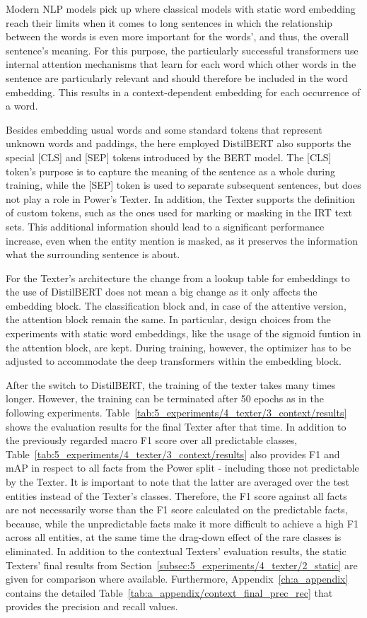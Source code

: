 Modern NLP models pick up where classical models with static word embedding reach their limits when it comes to long sentences in which the relationship between the words is even more important for the words', and thus, the overall sentence's meaning. For this purpose, the particularly successful transformers use internal attention mechanisms that learn for each word which other words in the sentence are particularly relevant and should therefore be included in the word embedding. This results in a context-dependent embedding for each occurrence of a word.

Besides embedding usual words and some standard tokens that represent unknown words and paddings, the here employed DistilBERT also supports the special [CLS] and [SEP] tokens introduced by the BERT model. The [CLS] token's purpose is to capture the meaning of the sentence as a whole during training, while the [SEP] token is used to separate subsequent sentences, but does not play a role in Power's Texter. In addition, the Texter supports the definition of custom tokens, such as the ones used for marking or masking in the IRT text sets. This additional information should lead to a significant performance increase, even when the entity mention is masked, as it preserves the information what the surrounding sentence is about.

For the Texter's architecture the change from a lookup table for embeddings to the use of DistilBERT does not mean a big change as it only affects the embedding block. The classification block and, in  case of the attentive version, the attention block remain the same. In particular, design choices from the experiments with static word embeddings, like the usage of the sigmoid funtion in the attention block, are kept. During training, however, the optimizer has to be adjusted to accommodate the deep transformers within the embedding block.

After the switch to DistilBERT, the training of the texter takes many times longer. However, the training can be terminated after 50 epochs as in the following experiments. Table~\ref{tab:5_experiments/4_texter/3_context/results} shows the evaluation results for the final Texter after that time. In addition to the previously regarded macro F1 score over all predictable classes, Table~\ref{tab:5_experiments/4_texter/3_context/results} also provides F1 and mAP in respect to all facts from the Power split - including those not predictable by the Texter. It is important to note that the latter are averaged over the test entities instead of the Texter's classes. Therefore, the F1 score against all facts are not necessarily worse than the F1 score calculated on the predictable facts, because, while the unpredictable facts make it more difficult to achieve a high F1 across all entities, at the same time the drag-down effect of the rare classes is eliminated. In addition to the contextual Texters' evaluation results, the static Texters' final results from Section~\ref{subsec:5_experiments/4_texter/2_static} are given for comparison where available. Furthermore, Appendix~\ref{ch:a_appendix} contains the detailed Table~\ref{tab:a_appendix/context_final_prec_rec} that provides the precision and recall values.

